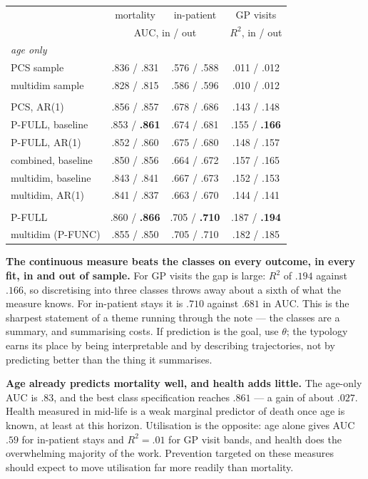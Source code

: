 \documentclass[11pt]{article}
\begin{document}
\begin{center}\small
\begin{tabular}{lccc}
\toprule
 & mortality & in-patient & GP visits \\
 & \multicolumn{2}{c}{AUC, in / out} & $R^2$, in / out \\
\midrule
\multicolumn{4}{l}{\emph{age only}} \\
\quad PCS sample & .836 / .831 & .576 / .588 & .011 / .012 \\
\quad multidim sample & .828 / .815 & .586 / .596 & .010 / .012 \\
\addlinespace
\multicolumn{4}{l}{\emph{age + class posterior}} \\
\quad PCS, AR(1) & .856 / .857 & .678 / .686 & .143 / .148 \\
\quad P-FULL, baseline & .853 / \textbf{.861} & .674 / .681 & .155 / \textbf{.166} \\
\quad P-FULL, AR(1) & .852 / .860 & .675 / .680 & .148 / .157 \\
\quad combined, baseline & .850 / .856 & .664 / .672 & .157 / .165 \\
\quad multidim, baseline & .843 / .841 & .667 / .673 & .152 / .153 \\
\quad multidim, AR(1) & .841 / .837 & .663 / .670 & .144 / .141 \\
\addlinespace
\multicolumn{4}{l}{\emph{age + the continuous measure}} \\
\quad P-FULL & .860 / \textbf{.866} & .705 / \textbf{.710} & .187 / \textbf{.194} \\
\quad multidim (P-FUNC) & .855 / .850 & .705 / .710 & .182 / .185 \\
\bottomrule
\end{tabular}
\end{center}

\textbf{The continuous measure beats the classes on every outcome, in every
fit, in and out of sample.} For GP visits the gap is large:
$R^2$ of $.194$ against $.166$, so discretising into three classes throws
away about a sixth of what the measure knows. For in-patient stays it is
$.710$ against $.681$ in AUC. This is the sharpest statement of a theme
running through the note --- the classes are a summary, and summarising
costs. If prediction is the goal, use $\theta$; the typology earns its place
by being interpretable and by describing trajectories, not by predicting
better than the thing it summarises.

\textbf{Age already predicts mortality well, and health adds little.} The
age-only AUC is $.83$, and the best class specification reaches $.861$ --- a
gain of about $.027$. Health measured in mid-life is a weak marginal
predictor of death once age is known, at least at this horizon. Utilisation
is the opposite: age alone gives AUC $.59$ for in-patient stays and
$R^2 = .01$ for GP visit bands, and health does the overwhelming majority
of the work. Prevention targeted on these measures should expect to move
utilisation far more readily than mortality.
\end{document}

